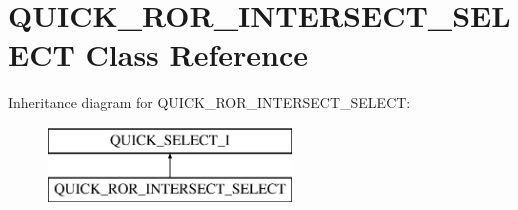 \hypertarget{classQUICK__ROR__INTERSECT__SELECT}{}\section{Q\+U\+I\+C\+K\+\_\+\+R\+O\+R\+\_\+\+I\+N\+T\+E\+R\+S\+E\+C\+T\+\_\+\+S\+E\+L\+E\+CT Class Reference}
\label{classQUICK__ROR__INTERSECT__SELECT}
Inheritance diagram for Q\+U\+I\+C\+K\+\_\+\+R\+O\+R\+\_\+\+I\+N\+T\+E\+R\+S\+E\+C\+T\+\_\+\+S\+E\+L\+E\+CT\+:\begin{figure}[H]
\begin{center}
\leavevmode
\includegraphics[height=2.000000cm]{classQUICK__ROR__INTERSECT__SELECT}
\end{center}
\end{figure}
